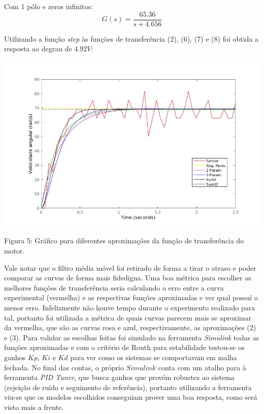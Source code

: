 \documentclass{article}
\begin{document}
Com 1 pólo e zeros infinitos:
\begin{equation}
    G(s) = \frac{65.36}{s + 4.656}
\end{equation}

Utilizando a função \textit{step} às funções de transferência (2), (6), (7) e (8) foi obtida a resposta ao degrau de $4.92V$:

\begin{center}
\centering
  \includegraphics[scale=0.5]{imagens/respaoDegrauLinda2Rel.jpg}
  
  \caption{Figura 5: Gráfico para diferentes aproximações da função de transferência do motor.}
\end{center}

Vale notar que o filtro média móvel foi retirado de forma a tirar o atraso e poder comparar as curvas de forma mais fidedigna. Uma boa métrica para escolher as melhores funções de transferência seria calculando o erro entre a curva experimental (vermelha) e as respectivas funções aproximadas e ver qual possuí o menor erro. Infelizmente não houve tempo durante o experimento realizado para tal, portanto foi utilizada a métrica de quais curvas parecem mais se aproximar da vermelha, que são as curvas rosa e azul, respectivamente, as aproximações (2) e (3).
Para validar as escolhas feitas foi simulado na ferramenta \textit{Simulink} todas as funções aproximadas e com o critério de Routh para estabilidade testou-se os ganhos $Kp$, $Ki$ e $Kd$ para ver como os sistemas se comportavam em malha fechada. No final das contas, o próprio $Simulink$ conta com um atalho para à ferramenta \textit{PID Tuner}, que busca ganhos que provém robustez ao sistema (rejeição de ruído e seguimento de referência), portanto utilizando a ferramenta viu-se que os modelos escolhidos conseguiam prover uma boa resposta, como será visto mais a frente.
\end{document}
